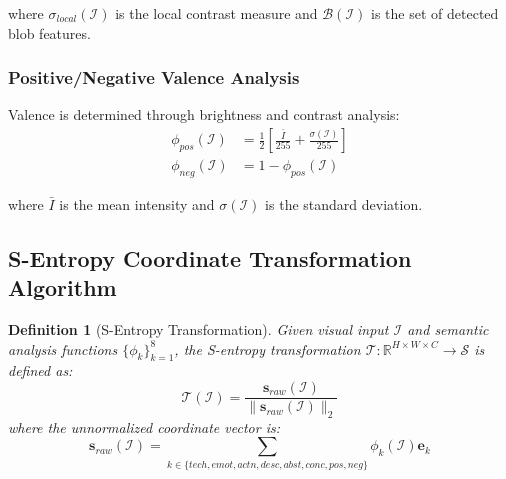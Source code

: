 \documentclass[11pt,a4paper]{article}
\newtheorem{definition}[theorem]{Definition}
\begin{document}
where $\sigma_{local}(\mathcal{I})$ is the local contrast measure and $\mathcal{B}(\mathcal{I})$ is the set of detected blob features.

\subsubsection{Positive/Negative Valence Analysis}

Valence is determined through brightness and contrast analysis:
\begin{align}
\phi_{pos}(\mathcal{I}) &= \frac{1}{2}\left[\frac{\bar{I}}{255} + \frac{\sigma(\mathcal{I})}{255}\right] \label{eq:positive-measure} \\
\phi_{neg}(\mathcal{I}) &= 1 - \phi_{pos}(\mathcal{I}) \label{eq:negative-measure}
\end{align}

where $\bar{I}$ is the mean intensity and $\sigma(\mathcal{I})$ is the standard deviation.

\subsection{S-Entropy Coordinate Transformation Algorithm}

\begin{definition}[S-Entropy Transformation]
Given visual input $\mathcal{I}$ and semantic analysis functions $\{\phi_k\}_{k=1}^8$, the S-entropy transformation $\mathcal{T}: \mathbb{R}^{H \times W \times C} \to \mathcal{S}$ is defined as:
\begin{equation}
\mathcal{T}(\mathcal{I}) = \frac{\mathbf{s}_{raw}(\mathcal{I})}{\|\mathbf{s}_{raw}(\mathcal{I})\|_2}
\label{eq:s-entropy-transform}
\end{equation}
where the unnormalized coordinate vector is:
\begin{equation}
\mathbf{s}_{raw}(\mathcal{I}) = \sum_{k \in \{tech,emot,actn,desc,abst,conc,pos,neg\}} \phi_k(\mathcal{I}) \mathbf{e}_k
\label{eq:raw-coordinate}
\end{equation}
\end{definition}
\end{document}
